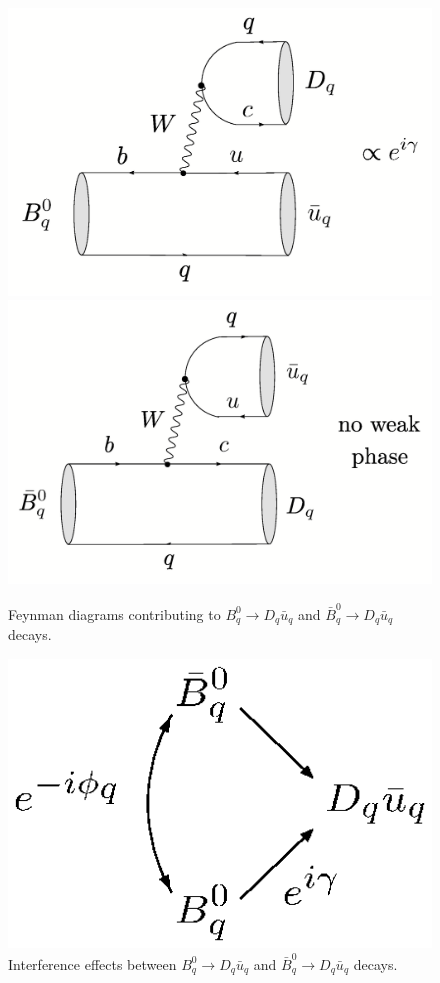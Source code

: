 \documentclass[12pt]{article}
\begin{document}
 
\begin{figure}[t]
\centerline{
 \includegraphics[width=5.2truecm]{B0qtoubarqDq-1.ps}
 \hspace*{0.5truecm}
 \includegraphics[width=5.2truecm]{B0qbartoDquqbar-1.ps}  
 }
 \vspace*{-0.3truecm}
\caption{Feynman diagrams contributing to $B^0_q\to D_q\bar u_q$
and $\bar B^0_q\to D_q \bar u_q$ 
decays.}\label{fig:BqDquq}
\end{figure}


\begin{figure}
\centerline{
 \includegraphics[width=3.0truecm]{B0qbar-B0q-Dquqbar-int-1.ps} }
 \vspace*{-0.3truecm}
\caption{Interference effects between $B^0_q\to D_q\bar u_q$
and $\bar B^0_q\to D_q\bar u_q$ 
decays.}\label{fig:BqDquq-int}
\end{figure}
\end{document}
